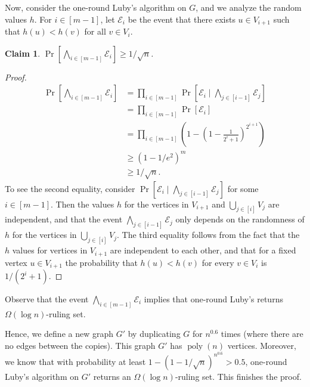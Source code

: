 \documentclass[11pt,letterpaper]{article}
\theoremstyle{plain}
\newtheorem*{claim*}{Claim}
\theoremstyle{definition}
\theoremstyle{remark}
\DeclareMathOperator{\poly}{poly}
\begin{document}
Now, consider the one-round Luby's algorithm on $G$,
and we analyze the random values $h$.
For $i \in [m - 1]$, let $\mathcal{E}_i$ be the event that there exists $u \in V_{i + 1}$ such that
$h(u) < h(v)$ for all $v \in V_{i}$.

\begin{claim*}
    $\Pr[\bigwedge_{i \in [m-1]} \mathcal{E}_i] \geq 1 / \sqrt{n}$.
\end{claim*}
\begin{proof}
    \begin{align*}
        \Pr[\bigwedge_{i \in [m-1]} \mathcal{E}_i] 
        &= \prod_{i \in [m-1]} \Pr[\mathcal{E}_i \mid \bigwedge_{j \in [i - 1]} \mathcal{E}_j] \\
        &= \prod_{i \in [m-1]} \Pr[\mathcal{E}_i] \\
        &= \prod_{i \in [m-1]} \left(1 - \left(1 - \frac{1} {2^i + 1}\right)^{2^{i + 1}}\right) \\
        &\geq (1 - 1 / e^2)^m \\
        &\geq 1 / \sqrt n.
    \end{align*}
    To see the second equality,
consider $\Pr[\mathcal{E}_{i} \mid \bigwedge_{j\in [i-1]} \mathcal{E}_{j}]$ for some $i\in [m - 1]$.
    Then the values $h$ for the vertices in $V_{i + 1}$ and $\bigcup_{j\in [i]} V_{j}$ are independent, and that the event $\bigwedge_{j\in [i-1]} \mathcal{E}_{j}$ only depends on the randomness of $h$ for the vertices in $\bigcup_{j\in [i]} V_{j}$. 
    The third equality follows from the fact that the $h$ values for vertices in $V_{i+1}$ are independent to each other,
    and that for a fixed vertex $u \in V_{i + 1}$ the probability that $h(u) < h(v)$ for every $v \in V_i$
    is $1 / (2^i + 1)$.
\end{proof}
Observe that the event $\bigwedge_{i \in [m-1]} \mathcal{E}_{i}$ implies that one-round Luby's returns $\Omega(\log n)$-ruling set.

Hence, we define a new graph $G'$ by duplicating $G$ for $n^{0.6}$ times (where there are no edges between the copies).
This graph $G'$ has $\poly(n)$ vertices.
Moreover, we know that with probability at least $1 - (1 - 1 / \sqrt{n})^{n^{0.6}} > 0.5$,
one-round Luby's algorithm on $G'$ returns an $\Omega(\log n)$-ruling set.
This finishes the proof.


     
\end{document}
